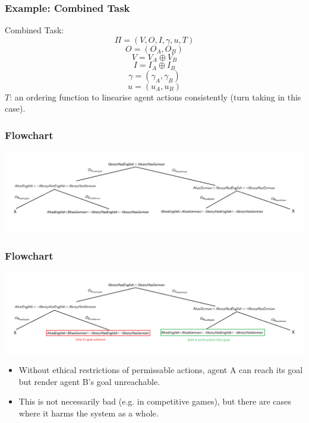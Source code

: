 \documentclass{beamer}
\begin{document}
\begin{frame}
\frametitle{Example: Combined Task}
Combined Task:
\[
\Pi = (V, O, I, \gamma, u, T)
\]
\[
O = (O_A, O_B)
\]
\[
V = V_A \oplus V_B
\]
\[
I = I_A \oplus I_B
\]
\[
\gamma = (\gamma_A, \gamma_B)
\]
\[
u=(u_A, u_B)
\]
$T$: an ordering function to linearise agent actions consistently  (turn taking in this case).
 \end{frame}
 
 
 
\begin{frame}
\frametitle{Flowchart}
\centering \includegraphics[scale=0.23]{exampleFlowchart}
 \end{frame} 

\begin{frame}
\frametitle{Flowchart}
\centering \includegraphics[scale=0.23]{exampleFlowchartAnnotated}

\begin{itemize}
\item Without ethical restrictions of permissable actions, agent A can reach its goal but render agent B's goal unreachable.
\item This is not necessarily bad (e.g. in competitive games), but there are cases where it harms the system as a whole.
\end{itemize}
 \end{frame} 
 
\end{document}
